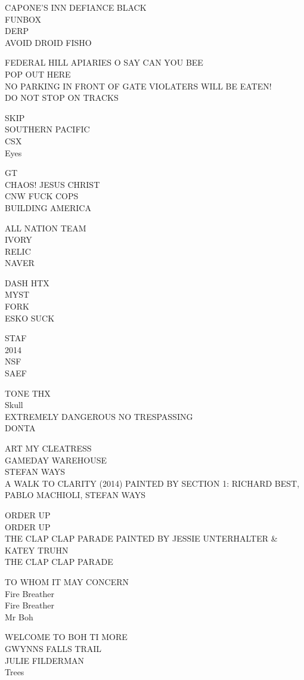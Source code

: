 \documentclass[10pt,letterpaper]{article}
\begin{document}
CAPONE'S INN DEFIANCE BLACK\\
FUNBOX\\
DERP\\
AVOID DROID FISHO

FEDERAL HILL APIARIES O SAY CAN YOU BEE\\
POP OUT HERE\\
NO PARKING IN FRONT OF GATE VIOLATERS WILL BE EATEN!\\
DO NOT STOP ON TRACKS

SKIP\\
SOUTHERN PACIFIC\\
CSX\\
Eyes

GT\\
CHAOS!  JESUS CHRIST\\
CNW FUCK COPS\\
BUILDING AMERICA

ALL NATION TEAM\\
IVORY\\
RELIC\\
NAVER

DASH HTX\\
MYST\\
FORK\\
ESKO SUCK

STAF\\
2014\\
NSF\\
SAEF

TONE THX\\
Skull\\
EXTREMELY DANGEROUS NO TRESPASSING\\
DONTA

ART MY CLEATRESS\\
GAMEDAY WAREHOUSE\\
STEFAN WAYS\\
A WALK TO CLARITY (2014) PAINTED BY SECTION 1: RICHARD BEST, PABLO MACHIOLI, STEFAN WAYS

ORDER UP\\
ORDER UP\\
THE CLAP CLAP PARADE PAINTED BY JESSIE UNTERHALTER \& KATEY TRUHN\\
THE CLAP CLAP PARADE

TO WHOM IT MAY CONCERN\\
Fire Breather\\
Fire Breather\\
Mr Boh

WELCOME TO BOH TI MORE\\
GWYNNS FALLS TRAIL\\
JULIE FILDERMAN\\
Trees
\end{document}
